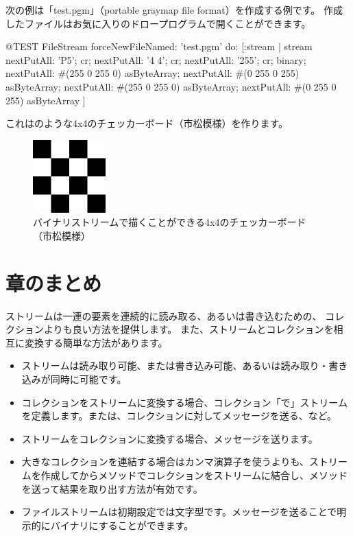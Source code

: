 \documentclass[a4paper,10pt,twoside]{book}
\begin{document}
次の例は「test.pgm」（portable graymap file format）を作成する例です。
作成したファイルはお気に入りのドロープログラムで開くことができます。


\begin{code}{@TEST}
FileStream
  forceNewFileNamed: 'test.pgm' 
  do: [:stream |
	stream
		nextPutAll: 'P5'; cr;
		nextPutAll: '4 4'; cr;
		nextPutAll: '255'; cr;
		binary;
		nextPutAll: #(255 0 255 0) asByteArray;
		nextPutAll: #(0 255 0 255) asByteArray;
		nextPutAll: #(255 0 255 0) asByteArray;
		nextPutAll: #(0 255 0 255) asByteArray
	]
\end{code}

これはのような4x4のチェッカーボード（市松模様）を作ります。

\begin{figure}[!ht]
\centerline{\includegraphics[width=0.25\textwidth]{checkerboard4x4}}
\caption{バイナリストリームで描くことができる4x4のチェッカーボード（市松模様）}
\vspace{.2in}
\end{figure}

\section{章のまとめ}

ストリームは一連の要素を連続的に読み取る、あるいは書き込むための、
コレクションよりも良い方法を提供します。
また、ストリームとコレクションを相互に変換する簡単な方法があります。
\begin{itemize}
  \item ストリームは読み取り可能、または書き込み可能、あるいは読み取り・書き込みが同時に可能です。
  \item コレクションをストリームに変換する場合、コレクション「で」ストリームを定義します。\eg {}または、コレクションに対してメッセージを送る、など。
  \item ストリームをコレクションに変換する場合、メッセージを送ります。
  \item 大きなコレクションを連結する場合はカンマ演算子を使うよりも、ストリームを作成してからメソッドでコレクションをストリームに結合し、メソッドを送って結果を取り出す方法が有効です。
  \item ファイルストリームは初期設定では文字型です。メッセージを送ることで明示的にバイナリにすることができます。
\end{itemize}

\ifx\wholebook\relax\else
\end{document}

